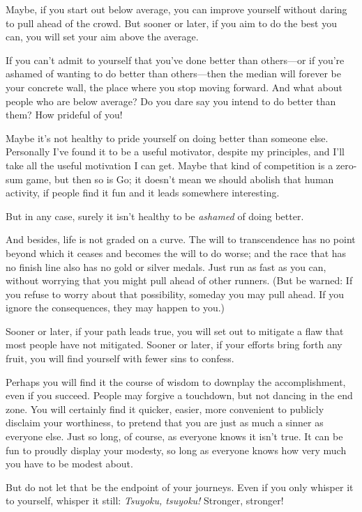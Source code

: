 {
 Maybe, if you start out below average, you can improve yourself
without daring to pull ahead of the crowd. But sooner or later, if you
aim to do the best you can, you will set your aim above the average.}

{
 If you can't admit to yourself that
you've done better than others---or if
you're ashamed of wanting to do better than
others---then the median will forever be your concrete wall, the place
where you stop moving forward. And what about people who are below
average? Do you dare say you intend to do better than them? How
prideful of you!}

{
 Maybe it's not healthy to pride yourself on doing
better than someone else. Personally I've found it to
be a useful motivator, despite my principles, and I'll
take all the useful motivation I can get. Maybe that kind of
competition is a zero-sum game, but then so is Go; it
doesn't mean we should abolish that human activity, if
people find it fun and it leads somewhere interesting.}

{
 But in any case, surely it isn't healthy to be
\textit{ashamed} of doing better.}

{
 And besides, life is not graded on a curve. The will to
transcendence has no point beyond which it ceases and becomes the will
to do worse; and the race that has no finish line also has no gold or
silver medals. Just run as fast as you can, without worrying that you
might pull ahead of other runners. (But be warned: If you refuse to
worry about that possibility, someday you may pull ahead. If you ignore
the consequences, they may happen to you.)}

{
 Sooner or later, if your path leads true, you will set out to
mitigate a flaw that most people have not mitigated. Sooner or later,
if your efforts bring forth any fruit, you will find yourself with
fewer sins to confess.}

{
 Perhaps you will find it the course of wisdom to downplay the
accomplishment, even if you succeed. People may forgive a touchdown,
but not dancing in the end zone. You will certainly find it quicker,
easier, more convenient to publicly disclaim your worthiness, to
pretend that you are just as much a sinner as everyone else. Just so
long, of course, as everyone knows it isn't true. It
can be fun to proudly display your modesty, so long as everyone knows
how very much you have to be modest about.}

{
 But do not let that be the endpoint of your journeys. Even if you
only whisper it to yourself, whisper it still: \textit{Tsuyoku,
tsuyoku!} Stronger, stronger!}

